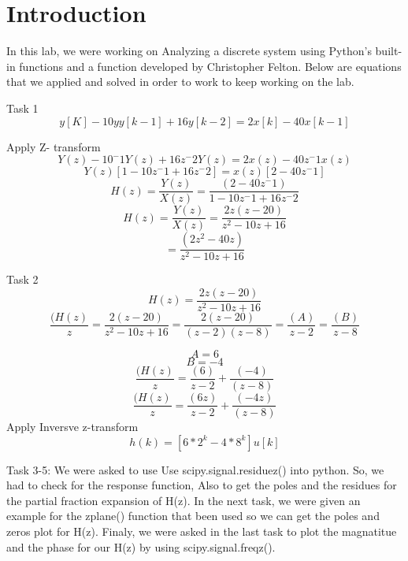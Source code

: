 \documentclass[12pt]{report}
\begin{document}
\section{Introduction}

In this lab, we were working on Analyzing a discrete system using Python’s built-in functions and a function developed by Christopher Felton. Below are equations that we applied and solved in order to work to keep working on the lab.


Task 1
$$y[K]-10yy[k-1]+16y[k-2]=2x[k]-40x[k-1]$$

Apply Z- transform
$$Y(z)-10^-1Y(z)+16z^-2Y(z)=2x(z)-40z^-1x(z)$$
$$Y(z)[1-10z^-1+16z^-2]=x(z)[2-40z^-1]$$
$$H(z)=\frac{Y(z)}{X(z)}=\frac{(2-40z^-1)}{1-10z^-1+16z^-2}$$
$$H(z)=\frac{Y(z)}{X(z)}=\frac{2z(z-20)}{z^2-10z+16}$$
$$=\frac{(2z^2-40z)}{z^2-10z+16}$$

Task 2 
$$H(z) =\frac{2z(z-20)}{z^2-10z+16}$$
$$\frac{(H(z)}{z}= \frac{2(z-20)}{z^2-10z+16}= \frac{2(z-20)}{(z-2)(z-8)}= \frac{(A)}{z-2}= \frac{(B)}{z-8}$$


$$A= 6 $$
$$B= -4 $$
$$\frac{(H(z)}{z}= \frac{(6)}{z-2} + \frac{(-4)}{(z-8)}$$
$$\frac{(H(z)}{z}= \frac{(6z)}{z-2} + \frac{(-4z)}{(z-8)}$$
Apply Inversve z-transform
$$h(k)=[6*2^k-4*8^k]u[k]$$


Task 3-5:
We were asked to use Use scipy.signal.residuez() into python. So, we had to check for the response function, Also to get the poles and the residues for the partial fraction expansion of H(z). In the next task, we were given an example for the zplane() function that been used so we can get the poles and zeros plot for H(z). Finaly, we were asked in the last task to plot the magnatitue and the phase for our H(z) by using scipy.signal.freqz().
\end{document}
